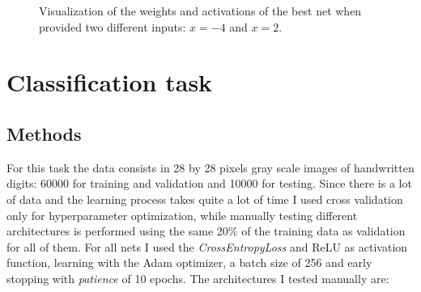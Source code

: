 \documentclass[a4paper, 11pt]{article}
\begin{document}
    \begin{figure}[H]
      \centering
       \quad
      \caption{Visualization of the weights and activations of the best net when provided two different inputs: $x = -4$ and $x = 2$.}
      \label{fig:r:visualization}
    \end{figure}


\section{Classification task}
  \subsection{Methods}
    For this task the data consists in 28 by 28 pixels gray scale images of handwritten digits: 60000 for training and validation and 10000 for testing. Since there is a lot of data and the learning process takes quite a lot of time I used cross validation only for hyperparameter optimization, while manually testing different architectures is performed using the same 20\% of the training data as validation for all of them.
    For all nets I used the \emph{CrossEntropyLoss} and ReLU as activation function, learning with the Adam optimizer, a batch size of 256 and early stopping with \emph{patience} of 10 epochs.
    The architectures I tested manually are:
\end{document}
